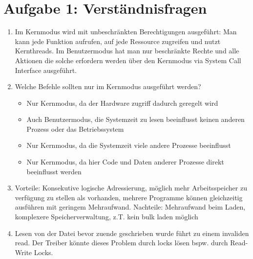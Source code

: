 \documentclass[a4paper,10pt]{article}
\begin{document}
\section*{Aufgabe 1: Verständnisfragen}
\begin{enumerate}
 \item Im Kernmodus wird mit unbeschränkten Berechtigungen ausgeführt: Man kann jede Funktion aufrufen, auf jede Ressource zugreifen und nutzt Kernthreads. Im Benutzermodus hat man nur beschränkte Rechte und alle Aktionen die solche erfordern werden über den Kernmodus via System Call Interface ausgeführt.
 \item Welche Befehle sollten nur im Kernmodus ausgeführt werden?
 \begin{itemize}
  \item Nur Kernmodus, da der Hardware zugriff dadurch geregelt wird
  \item Auch Benutzermodus, die Systemzeit zu lesen beeinflusst keinen anderen Prozess oder das Betriebssystem
  \item Nur Kernmodus, da die Systemzeit viele andere Prozesse beeinflusst
  \item Nur Kernmodus, da hier Code und Daten anderer Prozesse direkt beeinflusst werden
 \end{itemize}
 \item Vorteile: Konsekutive logische Adressierung, möglich mehr Arbeitsspeicher zu verfügung zu stellen als vorhanden, mehrere Programme können gleichzeitig ausführen mit geringem Mehraufwand. Nachteile: Mehraufwand beim Laden, komplexere Speicherverwaltung, z.T. kein bulk laden möglich
 \item Lesen von der Datei bevor zuende geschrieben wurde führt zu einem invaliden read. Der Treiber könnte dieses Problem durch locks lösen bspw. durch Read-Write Locks.
\end{enumerate}
\end{document}
